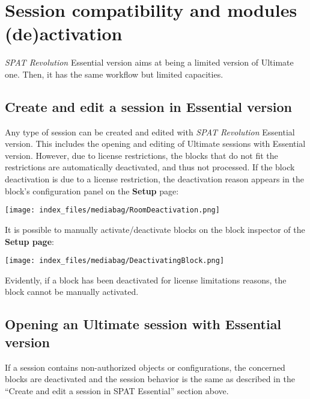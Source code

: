 \documentclass[
  letterpaper,
  DIV=11,
  numbers=noendperiod]{scrreport}
\begin{document}
\hypertarget{session-compatibility-and-modules-deactivation}{%
\chapter{Session compatibility and modules
(de)activation}\label{session-compatibility-and-modules-deactivation}}

\emph{SPAT Revolution} Essential version aims at being a limited version
of Ultimate one. Then, it has the same workflow but limited capacities.

\hypertarget{create-and-edit-a-session-in-essential-version}{%
\section{Create and edit a session in Essential
version}\label{create-and-edit-a-session-in-essential-version}}

Any type of session can be created and edited with \emph{SPAT
Revolution} Essential version. This includes the opening and editing of
Ultimate sessions with Essential version. However, due to license
restrictions, the blocks that do not fit the restrictions are
automatically deactivated, and thus not processed. If the block
deactivation is due to a license restriction, the deactivation reason
appears in the block's configuration panel on the \textbf{Setup} page:

\texttt{[image: index\_files/mediabag/RoomDeactivation.png]}

It is possible to manually activate/deactivate blocks on the block
inspector of the \textbf{Setup page}:

\texttt{[image: index\_files/mediabag/DeactivatingBlock.png]}

Evidently, if a block has been deactivated for license limitations
reasons, the block cannot be manually activated.

\hypertarget{opening-an-ultimate-session-with-essential-version}{%
\section{Opening an Ultimate session with Essential
version}\label{opening-an-ultimate-session-with-essential-version}}

If a session contains non-authorized objects or configurations, the
concerned blocks are deactivated and the session behavior is the same as
described in the ``Create and edit a session in SPAT Essential'' section
above.
\end{document}
